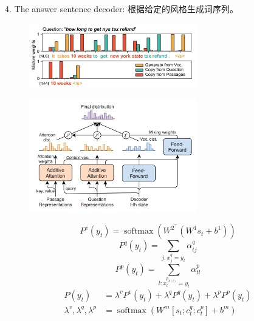 \documentclass[a4paper,UTF8]{article}
\numberwithin{equation}{section}
\begin{document}
4. The answer sentence decoder: 根据给定的风格生成词序列。
\begin{figure}[H]
	\centering
	\includegraphics[width=0.65\textwidth]{9-3.png}
\end{figure}
\begin{figure}[H]
	\centering
	\includegraphics[width=0.65\textwidth]{9-2.png}
\end{figure}
\begin{equation}
	P^{v}\left(y_{t}\right)=\operatorname{softmax}\left(W^{2^{\top}}\left(W^{1} s_{t}+b^{1}\right)\right)
	\end{equation}
	\begin{equation}
		P^{q}\left(y_{t}\right)=\sum_{j : x_{j}^{q}=y_{t}} \alpha_{t j}^{q}
		\end{equation}
		\begin{equation}
			P^{p}\left(y_{t}\right)=\sum_{l : x_{l}^{p_{k(l)}}=y_{t}}\alpha_{tl}^{p}
			\end{equation}
			\begin{equation}
			\begin{aligned} P\left(y_{t}\right) &=\lambda^{v} P^{v}\left(y_{t}\right)+\lambda^{q} P^{q}\left(y_{t}\right)+\lambda^{p} P^{p}\left(y_{t}\right) \\ \lambda^{v}, \lambda^{q}, \lambda^{p} &=\operatorname{softmax}\left(W^{m}\left[s_{t} ; c_{t}^{q} ; c_{t}^{p}\right]+b^{m}\right) \end{aligned}
			\end{equation}
\end{document}
